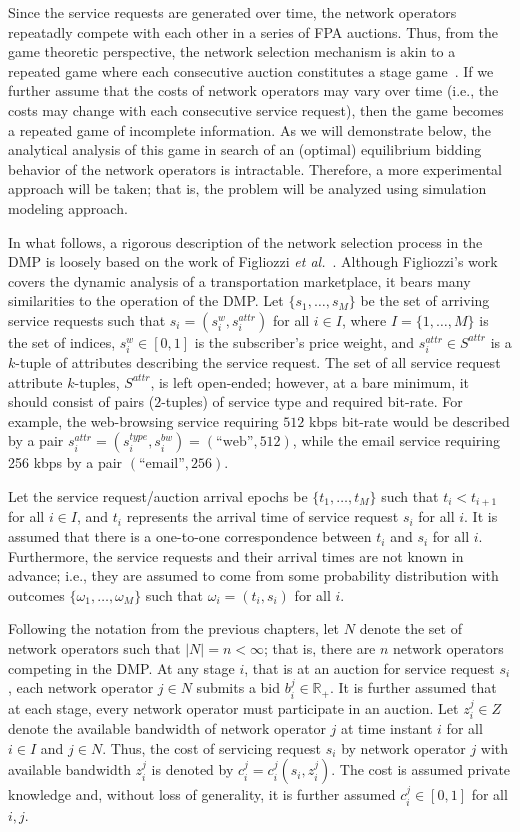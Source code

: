 Since the service requests are generated over time, the network operators repeatadly compete with each other in a series of FPA auctions. Thus, from the game theoretic perspective, the network selection mechanism is akin to a repeated game where each consecutive auction constitutes a stage game~\cite{BasarOlsder1999, Gibbons92}. If we further assume that the costs of network operators may vary over time (i.e., the costs may change with each consecutive service request), then the game becomes a repeated game of incomplete information. As we will demonstrate below, the analytical analysis of this game in search of an (optimal) equilibrium bidding behavior of the network operators is intractable. Therefore, a more experimental approach will be taken; that is, the problem will be analyzed using simulation modeling approach.

In what follows, a rigorous description of the network selection process in the DMP is loosely based on the work of Figliozzi \emph{et al.}~\cite{FigliozziJaillet2008}. Although Figliozzi's work covers the dynamic analysis of a transportation marketplace, it bears many similarities to the operation of the DMP. Let $\{s_1,\ldots,s_M\}$ be the set of arriving service requests such that $s_i = (s^w_i, s^{attr}_i)$ for all $i\in I$, where $I=\{1,\ldots,M\}$ is the set of indices, $s^w_i\in [0,1]$ is the subscriber's price weight, and $s^{attr}_i\in S^{attr}$ is a $k$-tuple of attributes describing the service request. The set of all service request attribute $k$-tuples, $S^{attr}$, is left open-ended; however, at a bare minimum, it should consist of pairs ($2$-tuples) of service type and required bit-rate. For example, the web-browsing service requiring $512$ kbps bit-rate would be described by a pair $s_i^{attr} = (s_i^{type},s_i^{bw}) = (\text{``web''}, 512)$, while the email service requiring 256 kbps by a pair $(\text{``email''}, 256)$.

Let the service request/auction arrival epochs be $\{t_1,\ldots,t_M\}$ such that $t_i < t_{i+1}$ for all $i\in I$, and $t_i$ represents the arrival time of service request $s_i$ for all $i$. It is assumed that there is a one-to-one correspondence between $t_i$ and $s_i$ for all $i$. Furthermore, the service requests and their arrival times are not known in advance; i.e., they are assumed to come from some probability distribution with outcomes $\{\omega_1,\ldots,\omega_M\}$ such that $\omega_i = (t_i, s_i)$ for all $i$.

Following the notation from the previous chapters, let $N$ denote the set of network operators such that $|N| = n < \infty$; that is, there are $n$ network operators competing in the DMP. At any stage $i$, that is at an auction for service request $s_i$, each network operator $j\in N$ submits a bid $b^j_i\in\mathbb{R}_+$. It is further assumed that at each stage, every network operator must participate in an auction. Let $z^j_i\in Z$ denote the available bandwidth of network operator $j$ at time instant $i$ for all $i\in I$ and $j\in N$. Thus, the cost of servicing request $s_i$ by network operator $j$ with available bandwidth $z^j_i$ is denoted by $c^j_i = c^j_i(s_i,z^j_i)$. The cost is assumed private knowledge and, without loss of generality, it is further assumed $c^j_i\in [0,1]$ for all $i,j$.

